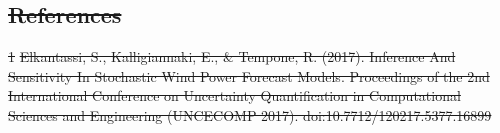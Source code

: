 \documentclass[ima, 20pt, portrait, plainboxedsections]{sciposter}
\providecommand{\DIFdel}[1]{{\protect\color{red}\sout{#1}}}                      %
\providecommand{\DIFdelbegin}{} %
\providecommand{\DIFdelend}{} %
\begin{document}
\begin{multicols}{3}
\DIFdelbegin \section*{\DIFdel{References}}
\DIFdel{1}%
\DIFdel{Elkantassi, S., Kalligiannaki, E., \& Tempone, R. (2017). Inference And Sensitivity In Stochastic Wind Power Forecast Models. Proceedings of the 2nd International Conference on Uncertainty Quantification in Computational Sciences and Engineering (UNCECOMP 2017). doi:10.7712/120217.5377.16899}%
\DIFdelend %

\end{multicols}
\end{document}
